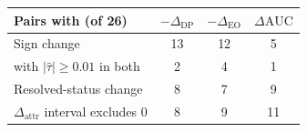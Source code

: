 \scriptsize
\setlength{\tabcolsep}{4.5pt}
\renewcommand{\arraystretch}{1.1}
\begin{tabular}{@{}lccc@{}}
\toprule
Pairs with (of 26) &
\(-\Delta_{\mathrm{DP}}\) &
\(-\Delta_{\mathrm{EO}}\) &
\(\Delta\mathrm{AUC}\) \\
\midrule
Sign change & 13 & 12 & 5 \\
\quad with \(|\hat\tau|\geq0.01\) in both & 2 & 4 & 1 \\
Resolved-status change & 8 & 7 & 9 \\
\(\Delta_{\mathrm{attr}}\) interval excludes 0 & 8 & 9 & 11 \\
\bottomrule
\end{tabular}









